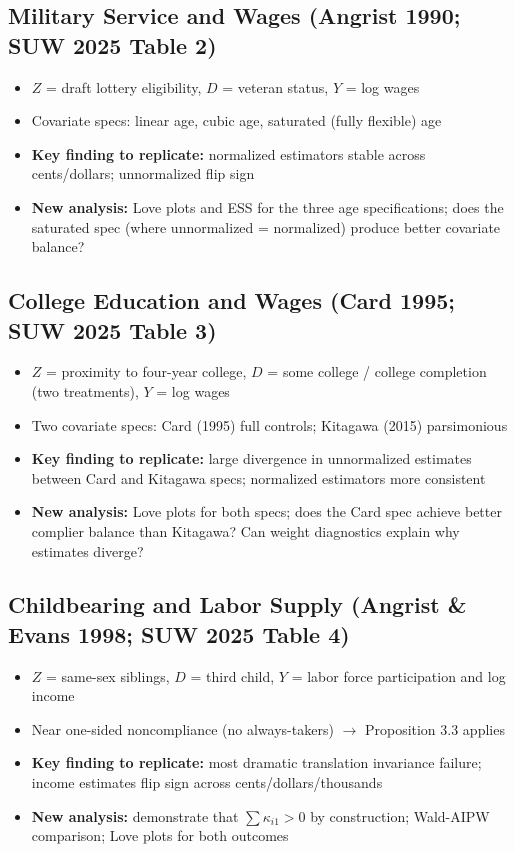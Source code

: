 \documentclass[12pt, a4paper]{article}
\begin{document}
\subsection{Military Service and Wages \textnormal{(Angrist 1990; SUW 2025 Table 2)}}

\begin{itemize}
  \item $Z$ = draft lottery eligibility, $D$ = veteran status, $Y$ = log wages
  \item Covariate specs: linear age, cubic age, saturated (fully flexible) age
  \item \textbf{Key finding to replicate:} normalized estimators stable across cents/dollars; unnormalized flip sign
  \item \textbf{New analysis:} Love plots and ESS for the three age specifications; does the saturated spec (where unnormalized = normalized) produce better covariate balance?
\end{itemize}

\subsection{College Education and Wages \textnormal{(Card 1995; SUW 2025 Table 3)}}

\begin{itemize}
  \item $Z$ = proximity to four-year college, $D$ = some college / college completion (two treatments), $Y$ = log wages
  \item Two covariate specs: Card (1995) full controls; Kitagawa (2015) parsimonious
  \item \textbf{Key finding to replicate:} large divergence in unnormalized estimates between Card and Kitagawa specs; normalized estimators more consistent
  \item \textbf{New analysis:} Love plots for both specs; does the Card spec achieve better complier balance than Kitagawa? Can weight diagnostics explain why estimates diverge?
\end{itemize}

\subsection{Childbearing and Labor Supply \textnormal{(Angrist \& Evans 1998; SUW 2025 Table 4)}}

\begin{itemize}
  \item $Z$ = same-sex siblings, $D$ = third child, $Y$ = labor force participation and log income
  \item Near one-sided noncompliance (no always-takers) $\to$ Proposition 3.3 applies
  \item \textbf{Key finding to replicate:} most dramatic translation invariance failure; income estimates flip sign across cents/dollars/thousands
  \item \textbf{New analysis:} demonstrate that $\sum \kappa_{i1} > 0$ by construction; Wald-AIPW comparison; Love plots for both outcomes
\end{itemize}
\end{document}
